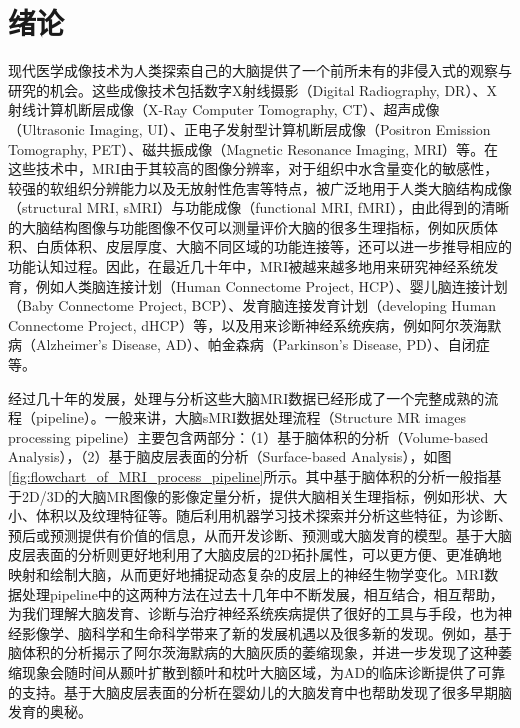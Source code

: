 \chapter{绪论}\label{sec:绪论}

现代医学成像技术为人类探索自己的大脑提供了一个前所未有的非侵入式的观察与研究的机会。这些成像技术包括数字X射线摄影（Digital Radiography, DR）、X 射线计算机断层成像（X-Ray Computer Tomography, CT）、超声成像（Ultrasonic Imaging, UI）、正电子发射型计算机断层成像（Positron Emission Tomography, PET）、磁共振成像（Magnetic Resonance Imaging, MRI）等\cite{picano2004sustainability}。在这些技术中，MRI由于其较高的图像分辨率，对于组织中水含量变化的敏感性，较强的软组织分辨能力以及无放射性危害等特点，被广泛地用于人类大脑结构成像（structural MRI, sMRI）与功能成像（functional MRI, fMRI）\cite{giedd1999brain}，由此得到的清晰的大脑结构图像与功能图像不仅可以测量评价大脑的很多生理指标，例如灰质体积、白质体积、皮层厚度、大脑不同区域的功能连接等，还可以进一步推导相应的功能认知过程\cite{poldrack2006can}。因此，在最近几十年中，MRI被越来越多地用来研究神经系统发育，例如人类脑连接计划（Human Connectome Project, HCP）\cite{van2013wu}、婴儿脑连接计划（Baby Connectome Project, BCP）\cite{howell2019unc}、发育脑连接发育计划（developing  Human Connectome  Project,  dHCP）\cite{makropoulos2018developing}等，以及用来诊断神经系统疾病，例如阿尔茨海默病（Alzheimer's Disease, AD）\cite{mueller2005alzheimer}、帕金森病（Parkinson's Disease, PD）\cite{brooks2003assessment}、自闭症\cite{anagnostou2011review}等。

经过几十年的发展，处理与分析这些大脑MRI数据已经形成了一个完整成熟的流程（pipeline）\cite{glasser2013minimal,li2019computational}。一般来讲，大脑sMRI数据处理流程（Structure MR images processing pipeline）主要包含两部分：（1）基于脑体积的分析（Volume-based Analysis），（2）基于脑皮层表面的分析（Surface-based Analysis），如图\ref{fig:flowchart_of_MRI_process_pipeline}所示。其中基于脑体积的分析一般指基于2D/3D的大脑MR图像的影像定量分析，提供大脑相关生理指标，例如形状、大小、体积以及纹理特征等。随后利用机器学习技术探索并分析这些特征，为诊断、预后或预测提供有价值的信息，从而开发诊断、预测或大脑发育的模型。基于大脑皮层表面的分析则更好地利用了大脑皮层的2D拓扑属性，可以更方便、更准确地映射和绘制大脑，从而更好地捕捉动态复杂的皮层上的神经生物学变化。MRI数据处理pipeline中的这两种方法在过去十几年中不断发展，相互结合，相互帮助，为我们理解大脑发育、诊断与治疗神经系统疾病提供了很好的工具与手段，也为神经影像学、脑科学和生命科学带来了新的发展机遇以及很多新的发现。例如，基于脑体积的分析揭示了阿尔茨海默病的大脑灰质的萎缩现象，并进一步发现了这种萎缩现象会随时间从颞叶扩散到额叶和枕叶大脑区域\cite{thompson2003dynamics}，为AD的临床诊断提供了可靠的支持。基于大脑皮层表面的分析在婴幼儿的大脑发育中也帮助发现了很多早期脑发育的奥秘\cite{li2019computational,wang2019developmental,duan2019exploring}。

